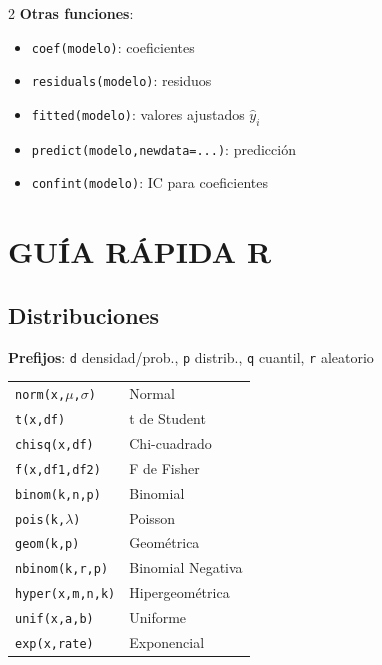 \documentclass[9pt,a4paper]{article}
\begin{document}
\begin{multicols}{2}
\textbf{Otras funciones}:
\begin{itemize}[leftmargin=*]
\item \texttt{coef(modelo)}: coeficientes
\item \texttt{residuals(modelo)}: residuos
\item \texttt{fitted(modelo)}: valores ajustados $\hat{y}_i$
\item \texttt{predict(modelo,newdata=...)}: predicción
\item \texttt{confint(modelo)}: IC para coeficientes
\end{itemize}

\section{GUÍA RÁPIDA R}

\subsection{Distribuciones}
\textbf{Prefijos}: \texttt{d} densidad/prob., \texttt{p} distrib., \texttt{q} cuantil, \texttt{r} aleatorio

\begin{tabular}{@{}ll@{}}
\texttt{norm(x,$\mu$,$\sigma$)} & Normal\\
\texttt{t(x,df)} & t de Student\\
\texttt{chisq(x,df)} & Chi-cuadrado\\
\texttt{f(x,df1,df2)} & F de Fisher\\
\texttt{binom(k,n,p)} & Binomial\\
\texttt{pois(k,$\lambda$)} & Poisson\\
\texttt{geom(k,p)} & Geométrica\\
\texttt{nbinom(k,r,p)} & Binomial Negativa\\
\texttt{hyper(x,m,n,k)} & Hipergeométrica\\
\texttt{unif(x,a,b)} & Uniforme\\
\texttt{exp(x,rate)} & Exponencial
\end{tabular}


\end{multicols}
\end{document}
